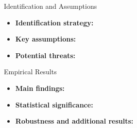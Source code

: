 \documentclass[aspectratio=169,11pt]{beamer}
\begin{document}

\begin{frame}{Identification and Assumptions}

    \begin{itemize}
        \item \textbf{Identification strategy:}

        \item \textbf{Key assumptions:}

        \item \textbf{Potential threats:}
    \end{itemize}

\end{frame}


\begin{frame}{Empirical Results}

    \begin{itemize}
        \item \textbf{Main findings:}

        \item \textbf{Statistical significance:}

        \item \textbf{Robustness and additional results:}
    \end{itemize}

    \vspace{0.3cm}


\end{frame}

\end{document}
